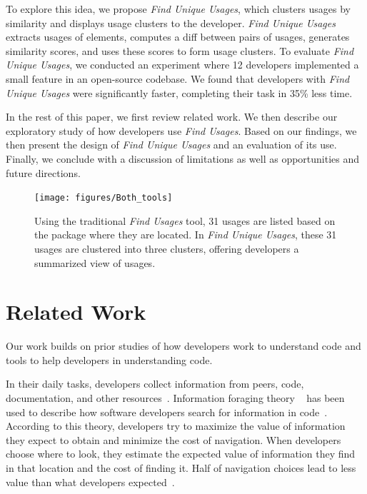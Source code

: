 \documentclass[conference]{IEEEtran}
\begin{document}
To explore this idea, we propose \textit{Find Unique Usages}, which clusters usages by similarity and displays usage clusters to the developer. \textit{Find Unique Usages} extracts usages of elements, computes a diff between pairs of usages, generates similarity scores, and uses these scores to form usage clusters.
To evaluate \textit{Find Unique Usages}, we conducted  an experiment where 12 developers implemented a small feature in an open-source codebase. We found that developers with \textit{Find Unique Usages} were significantly faster, completing their task in 35\% less time.\par

In the rest of this paper, we first review related work. We then describe our exploratory study of how developers use \textit{Find Usages}. Based on our findings, we then present the design of \textit{Find Unique Usages} and an evaluation of its use. Finally, we conclude with a discussion of limitations as well as opportunities and future directions.

\begin{figure}
    \centering
    \texttt{[image: figures/Both\_tools]}
    \caption{Using the traditional \textit{Find Usages} tool, 31 usages are listed based on the package where they are located. In \textit{Find Unique Usages}, these 31 usages are clustered into three clusters, offering developers a summarized view of usages.}
\label{fig:compare}
\end{figure}
\section{Related Work}
Our work builds on prior studies of how developers work to understand code and tools to help developers in understanding code.

In their daily tasks, developers collect information from peers, code, documentation, and other resources~\cite{latoza2006maintaining}. Information foraging theory ~\cite{pirolli1999informationforaging} has been used to describe how software developers search for information in code~\cite{fleming2013information}. According to this theory, developers try to maximize the value of information they expect to obtain and minimize the cost of navigation. When developers choose where to look, they estimate the expected value of information they find in that location and the cost of finding it. Half of navigation choices lead to less value than what developers expected~\cite{piorkowski2016foraging}. \par
\end{document}
